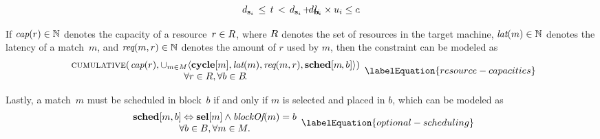 \begin{definition}
\begin{displaymath}
\begin{array}{c}
{\begin{array}{@{}l@{}}
{{                                  d_{\mVar{s}_i} \,\leq\, t \,<\,
                                  d_{\mVar{s}_i} \hspace{-.8pt}+\, l_i
                                }
                              }
                         \hspace{-1.2em}
                           d_{\mVar{b}_i} \times u_i
                         \leq c
                     \end{array}
                   }\!.
    \end{array}
  \end{displaymath}
\end{definition}

If \mbox{$\operatorname{\textit{cap}}(r) \in \mathbb{N}$} denotes the capacity of a
resource~\mbox{$r \in R$}, where $R$ denotes the set of
resources in the \gls{target machine}, \mbox{$\operatorname{\textit{lat}}(m) \in \mathbb{N}$} denotes
the latency of a \gls{match}~$m$\hspace{-.8pt}, and \mbox{$\operatorname{\textit{req}}(m, r)
  \in \mathbb{N}$} denotes the amount of $r$ used by $m$\hspace{-.8pt}, then
the \gls{constraint} can be modeled as
%
\begin{equation}
  \begin{array}{c}
    \mCumulative
    \!
    \left(
      \hspace{1pt}
      \mCapOf(r),
      \cup_{m \in \mMatchSet}
      \mTuple{
        \mVar{cycle}[m],
        \mLat(m),
        \mResourceUse(m, r),
        \mVar{sched}[m \hspace{-.8pt}, b]
      }
    \right) \\
    \forall r \in \mResourceSet,
    \forall b \in \mBlockSet \!.
  \end{array}
  \labelEquation{resource-capacities}
\end{equation}

Lastly, a \gls{match}~$m$ must be scheduled in \gls{block}~$b$ if and only if
$m$ is selected and placed in $b$, which can be modeled as
%
\begin{equation}
  \begin{array}{c}
    \mVar{sched}[m, b]
    \mEq
    \mVar{sel}[m] \mAnd \mBlockOf(m) = b \\
    \forall b \in \mBlockSet,
    \forall m \in \mMatchSet.
  \end{array}
  \labelEquation{optional-scheduling}
\end{equation}


